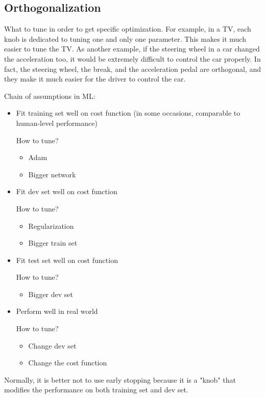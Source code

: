 \subsection{Orthogonalization}
What to tune in order to get specific optimization. 
For example, in a TV, each knob is dedicated to tuning one and only one parameter. This makes it much easier to tune the TV. 
As another example, if the steering wheel in a car changed the acceleration too, it would be extremely difficult to control the car properly. 
In fact, the steering wheel, the break, and the acceleration pedal are orthogonal, and they make it much easier for the driver to control the car. 

Chain of assumptions in ML: 
\begin{itemize}
    \item Fit training set well on cost function (in some occasions, comparable to human-level performance)
        
    How to tune?
    \begin{itemize}
        \item Adam
        \item Bigger network
    \end{itemize}
    \item Fit dev set well on cost function
    
    How to tune?
    \begin{itemize}
        \item Regularization
        \item Bigger train set
    \end{itemize}
    \item Fit test set well on cost function
    
    How to tune?
    \begin{itemize}
        \item Bigger dev set
    \end{itemize}
    \item Perform well in real world
    
    How to tune?
    \begin{itemize}
        \item Change dev set
        \item Change the cost function
    \end{itemize}
\end{itemize}

Normally, it is better not to use early stopping because it is a "knob" that modifies the performance on both training set and dev set. 

